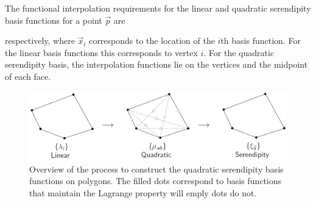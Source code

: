 \documentclass[11pt]{article}
\begin{document}
The functional interpolation requirements for the linear and quadratic serendipity basis functions for a point $\vec{p}$ are

\noindent respectively, where $\vec{x}_i$ corresponds to the location of the $i$th basis function. For the linear basis functions this corresponds to vertex $i$. For the quadratic serendipity basis, the interpolation functions lie on the vertices and the midpoint of each face.


\begin{figure}[hbt]
\centering
\includegraphics[width=\textwidth]{figures/linear_to_quad_process.png}
\caption{Overview of the process to construct the quadratic serendipity basis functions on polygons. The filled dots correspond to basis functions that maintain the Lagrange property will emply dots do not.}
\label{fig::lin_to_quad_process}
\end{figure}
\end{document}
